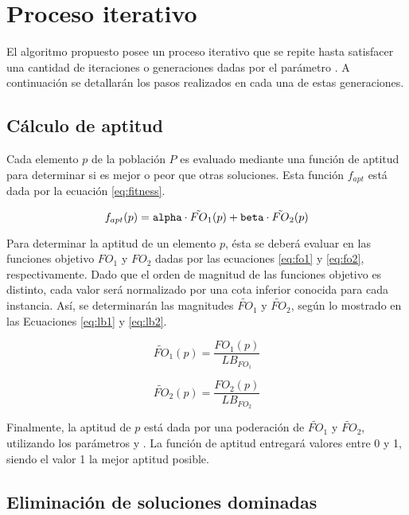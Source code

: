 \section{Proceso iterativo}

El algoritmo propuesto posee un proceso iterativo que se repite hasta satisfacer una cantidad de iteraciones o generaciones dadas por el parámetro \generaciones. A continuación se detallarán los pasos realizados en cada una de estas generaciones.

\subsection{Cálculo de aptitud}

Cada elemento $p$ de la población $P$ es evaluado mediante una función de aptitud para determinar si es mejor o peor que otras soluciones. Esta función $f_{apt}$ está dada por la ecuación \eqref{eq:fitness}.

\begin{equation}
\label{eq:fitness}
f_{apt}(p) = \texttt{alpha} \cdot \tilde{FO}_1(p) + \texttt{beta} \cdot \tilde{FO}_2(p)
\end{equation}

Para determinar la aptitud de un elemento $p$, ésta se deberá evaluar en las funciones objetivo $FO_1$ y $FO_2$ dadas por las ecuaciones \eqref{eq:fo1} y \eqref{eq:fo2}, respectivamente. Dado que el orden de magnitud de las funciones objetivo es distinto, cada valor será normalizado por una cota inferior conocida para cada instancia. Así, se determinarán las magnitudes $\tilde{FO}_1$ y $\tilde{FO}_2$, según lo mostrado en las Ecuaciones \eqref{eq:lb1} y \eqref{eq:lb2}.

\begin{equation}
\label{eq:lb1}
\tilde{FO}_1(p) = \frac{FO_1(p)}{LB_{FO_1}}
\end{equation}

\begin{equation}
\label{eq:lb2}
\tilde{FO}_2(p) = \frac{FO_2(p)}{LB_{FO_2}}
\end{equation}

Finalmente, la aptitud de $p$ está dada por una poderación de $\tilde{FO}_1$ y $\tilde{FO}_2$, utilizando los parámetros \alp{} y \bet. La función de aptitud entregará valores entre 0 y 1, siendo el valor 1 la mejor aptitud posible.

\subsection{Eliminación de soluciones dominadas}

